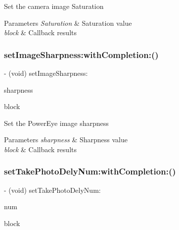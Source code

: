 Set the camera image Saturation


\begin{DoxyParams}{Parameters}
{\em Saturation} & Saturation value \\
\hline
{\em block} & Callback results \\
\hline
\end{DoxyParams}
\mbox{\label{interface_p_v_camera_a89432430f4c187806f1efc35f19f95ea}} 
\subsubsection{\texorpdfstring{set\+Image\+Sharpness\+:with\+Completion\+:()}{setImageSharpness:withCompletion:()}}
{\footnotesize\ttfamily -\/ (void) set\+Image\+Sharpness\+: \begin{DoxyParamCaption}\item[{(N\+S\+Integer)}]{sharpness }\item[{withCompletion:(P\+V\+Completion\+Block)}]{block }\end{DoxyParamCaption}}

Set the Power\+Eye image sharpness


\begin{DoxyParams}{Parameters}
{\em sharpness} & Sharpness value \\
\hline
{\em block} & Callback results \\
\hline
\end{DoxyParams}
\mbox{\label{interface_p_v_camera_a9e9449489b48af1f823624e0ade0da87}} 
\subsubsection{\texorpdfstring{set\+Take\+Photo\+Dely\+Num\+:with\+Completion\+:()}{setTakePhotoDelyNum:withCompletion:()}}
{\footnotesize\ttfamily -\/ (void) set\+Take\+Photo\+Dely\+Num\+: \begin{DoxyParamCaption}\item[{(N\+S\+Integer)}]{num }\item[{withCompletion:(P\+V\+Completion\+Block)}]{block }\end{DoxyParamCaption}}

